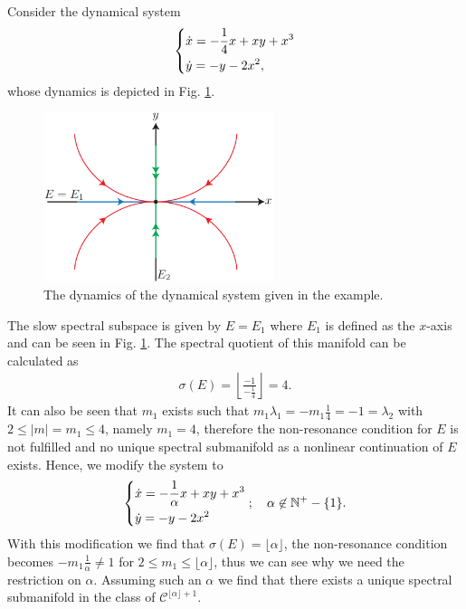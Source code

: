 \begin{ex}[]
	Consider the dynamical system
	\begin{align}
		\begin{dcases}
			\dot{x} = - \frac{1}{4}x + xy + x^{3}\\
			\dot{y} = -y - 2x^2,
		\end{dcases}
	\end{align}
	whose dynamics is depicted in Fig. \ref{fig:SSM_ex1}.
	\begin{figure}[h!]
		\centering
		\includegraphics[width=0.6\textwidth]{figures/ch9/31ssm_ex1.pdf}
		\caption{The dynamics of the dynamical system given in the example.}
		\label{fig:SSM_ex1}
	\end{figure}	
	The slow spectral subspace is given by $E=E_1$ where $E_1$ is defined as the $x$-axis and can be seen in Fig. \ref{fig:SSM_ex1}. The spectral quotient of this manifold can be calculated as
	\begin{align}
		\sigma(E) = \left\lfloor \frac{-1}{-\frac{1}{4}} \right\rfloor = 4.
	\end{align}
	It can also be seen that $m_1$ exists such that $m_1\lambda_1 = -m_1 \frac{1}{4} = -1 = \lambda_2 $ with $2 \leq |m| =m_1 \leq 4$, namely $m_1=4$, therefore the non-resonance condition for $E$ is not fulfilled and no unique spectral submanifold as a nonlinear continuation of $E$ exists.
	Hence, we modify the system to
	\begin{align}
		\begin{dcases}
			\dot{x} = -\frac{1}{\alpha } x + xy + x^{3}\\
			\dot{y} = -y - 2x^2
		\end{dcases};\quad
		\alpha \not \in \mathbb{N}^{+} -\{1\}. \label{eq9:113}
	\end{align}
	With this modification we find that $\sigma(E) = \lfloor \alpha \rfloor$, the non-resonance condition becomes $-m_1 \frac{1}{\alpha } \neq 1$ for $2\leq m_1 \leq \lfloor \alpha \rfloor$, thus we can see why we need the restriction on $\alpha $. Assuming such an $\alpha $ we find that there exists a unique spectral submanifold in the class of $\mathcal{C}^{\lfloor \alpha \rfloor + 1}$.


\end{ex}
